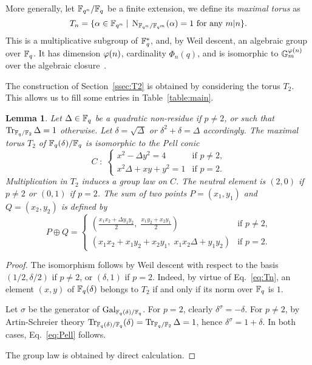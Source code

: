 \documentclass{sig-alternate}
\newtheorem{lemma}[definition]{Lemma}
\begin{document}
More generally, let $\mathbb{F}_{q^n}/\mathbb{F}_q$ be a finite extension, we define
its \emph{maximal torus} as
\begin{equation}
  \label{eq:Tn}
  T_n = \{\alpha\in\mathbb{F}_{q^n} \;|\; \operatorname{N}_{\mathbb{F}_{q^n}/\mathbb{F}_{q^m}}(\alpha) = 1 
  \text{ for any $m|n$} \}.
\end{equation}
This is a multiplicative subgroup of $\mathbb{F}_q^\ast$, and, by Weil
descent, an algebraic group over $\mathbb{F}_q$. It has dimension $\varphi(n)$,
cardinality $\Phi_n(q)$, and is isomorphic to
$\mathbb{G}_m^{\varphi(n)}$ over the algebraic
closure~\cite{rubin+silverberg03,voskresenskii98}.

The construction of Section~\ref{ssec:T2} is obtained by considering
the torus $T_2$. This allows us to fill some entries in
Table~\ref{table:main}.

\begin{lemma}
  Let $\Delta\in\mathbb{F}_q$ be a quadratic non-residue if $p\ne2$, or such
  that $\operatorname{Tr}_{\mathbb{F}_q/\mathbb{F}_2}\Delta=1$ otherwise. Let $\delta=\sqrt{\Delta}$
  or $\delta^2+\delta=\Delta$ accordingly. The
  maximal torus $T_2$ of $\mathbb{F}_q(\delta)/\mathbb{F}_q$ is isomorphic to the
  \emph{Pell conic}
  \begin{equation}
    \label{eq:Pell}
    C \;:\; 
    \begin{cases}
      x^2 - \Delta y^2 = 4 &\text{if $p\ne2$,}\\
      x^2\Delta + xy + y^2 = 1 &\text{if $p=2$.}
    \end{cases}
  \end{equation}
  Multiplication in $T_2$ induces a group law on $C$. The neutral
  element is $(2,0)$ if $p\ne2$ or $(0,1)$ if $p=2$. The sum of two
  points $P=(x_1,y_1)$ and $Q=(x_2,y_2)$ is defined
  by
  \begin{equation*}
    P\oplus Q =
    \begin{cases}
      \displaystyle
      \left(\frac{x_1x_2 + \Delta y_1y_2}{2},\; \frac{x_1y_2 + x_2y_1}{2}\right) &
      \text{if $p\ne2$,}\\
      \left(x_1x_2 + x_1y_2 + x_2y_1,\; x_1x_2\Delta + y_1y_2\right) &
      \text{if $p=2$.}
    \end{cases}
  \end{equation*}
\end{lemma}
\begin{proof}
  The isomorphism follows by Weil descent with respect to the basis
  $(1/2,\delta/2)$ if $p\ne2$, or $(\delta,1)$ if $p=2$. Indeed, by
  virtue of Eq.~\eqref{eq:Tn}, an element $(x,y)$ of $\mathbb{F}_q(\delta)$
  belongs to $T_2$ if and only if its norm over $\mathbb{F}_q$ is $1$.

  Let $\sigma$ be the generator of $\operatorname{Gal}_{\mathbb{F}_q(\delta)/\mathbb{F}_q}$. For
  $p=2$, clearly $\delta^\sigma=-\delta$. For $p\ne2$, by
  Artin-Schreier theory
  $\operatorname{Tr}_{\mathbb{F}_q(\delta)/\mathbb{F}_q}(\delta)=\operatorname{Tr}_{\mathbb{F}_q/\mathbb{F}_2}\Delta=1$, hence
  $\delta^\sigma=1+\delta$. In both cases, Eq.~\eqref{eq:Pell}
  follows.

  The group law is obtained by direct calculation.
\end{proof}
\end{document}
